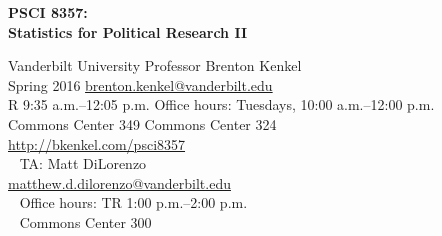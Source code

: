 \documentclass[12pt,svgnames]{article}
\begin{document}
\begin{Huge}
  \textsf{\textbf{PSCI 8357:\\[0.2em] Statistics for Political Research II}}
\end{Huge}

\textsf{%
  Vanderbilt University \hfill Professor Brenton Kenkel \\
  Spring 2016 \hfill \href{mailto:brenton.kenkel@vanderbilt.edu}{brenton.kenkel@vanderbilt.edu} \\
  R 9:35 a.m.--12:05 p.m. \hfill Office hours: Tuesdays, 10:00 a.m.--12:00 p.m. \\
  Commons Center 349 \hfill Commons Center 324 \\
  \url{http://bkenkel.com/psci8357} \\
  \mbox{}~ \hfill TA: Matt DiLorenzo \\
  \mbox{} \hfill \href{mailto:matthew.d.dilorenzo@vanderbilt.edu}{matthew.d.dilorenzo@vanderbilt.edu} \\
  \mbox{}~ \hfill Office hours: TR 1:00 p.m.--2:00 p.m. \\
  \mbox{}~ \hfill Commons Center 300
}

\bigskip


\end{document}
